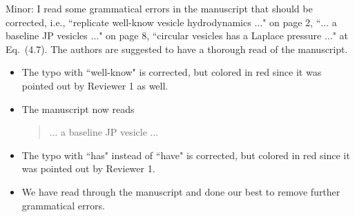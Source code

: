 \documentclass[11pt]{article}
\newcommand{\comment}[1]{{\color{blue} #1}}
\begin{document}
\noindent
\comment{Minor: I read some grammatical errors in the manuscript that
should be corrected, i.e., ``replicate well-know vesicle hydrodynamics
$\ldots$" on page 2, ``$\ldots$ a baseline JP vesicles $\ldots$" on page
8, ``circular vesicles has a Laplace pressure $\ldots$" at Eq.~(4.7).
The authors are suggested to have a thorough read of the manuscript.}
\begin{itemize}
  \item The typo with ``well-know" is corrected, but colored in red
    since it was pointed out by Reviewer 1 as well.

  \item The manuscript now reads
    \begin{quotation}
      $\ldots$ a baseline JP vesicle $\ldots$
    \end{quotation}

  \item The typo with ``has" instead of ``have" is corrected, but
    colored in red since it was pointed out by Reviewer 1.

  \item We have read through the manuscript and done our best to
    remove further grammatical errors.

\end{itemize}
\end{document}
